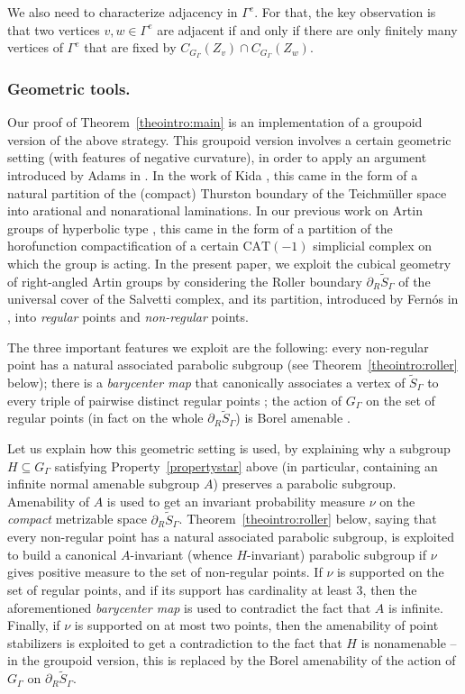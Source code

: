 \documentclass[JEP,XML,SOM,Unicode,NoFloatCountersInSection,published]{cedram}
\theoremstyle{plain}
\theoremstyle{definition}
\begin{document}
We also need to characterize adjacency in $\Gamma^e$. For that, the key observation is that two vertices $v,w\in \Gamma^e$ are adjacent if and only if there are only finitely many vertices of $\Gamma^e$ that are fixed by $C_{G_\Gamma}(Z_v)\cap C_{G_\Gamma}(Z_w)$.

\subsubsection*{Geometric tools.} Our proof of Theorem~\ref{theointro:main} is an implementation of a groupoid version of the above strategy. This groupoid version involves a certain geometric setting (with features of negative curvature), in order to apply an argument introduced by Adams in \cite{Ada}. In the work of Kida \cite{Kid}, this came in the form of a natural partition of the (compact) Thurston boundary of the Teichmüller space into arational and nonarational laminations. In our previous work on Artin groups of hyperbolic type \cite{HH}, this came in the form of a partition of the horofunction compactification of a certain $\mathrm{CAT}(-1)$ simplicial complex on which the group is acting. In the present paper, we exploit the cubical geometry of right-angled Artin groups by considering the Roller boundary $\partial_R\widetilde{S}_\Gamma$ of the universal cover of the Salvetti complex, and its partition, introduced by Fernós in \cite{Fer}, into \emph{regular} points and \emph{non-regular} points.

The three important features we exploit are the following: every non-regular point has a natural associated parabolic subgroup (see Theorem~\ref{theointro:roller} below); there is a \emph{barycenter map} that canonically associates a vertex of $\widetilde{S}_\Gamma$ to every triple of pairwise distinct regular points \cite{FLM}; the action of $G_\Gamma$ on the set of regular points (in fact on the whole $\partial_R\widetilde{S}_\Gamma$) is Borel amenable \cite{NS,Duc}.

Let us explain how this geometric setting is used, by explaining why a subgroup $H\subseteq G_\Gamma$ satisfying Property~\eqref{propertystar} above (in particular, containing an infinite normal amenable subgroup $A$) preserves a parabolic subgroup. Amenability of $A$ is used to get an invariant probability measure $\nu$ on the \emph{compact} metrizable space $\partial_R\widetilde{S}_\Gamma$. Theorem~\ref{theointro:roller} below, saying that every non-regular point has a natural associated parabolic subgroup, is exploited to build a canonical $A$-invariant (whence $H$-invariant) parabolic subgroup if $\nu$ gives positive measure to the set of non-regular points. If $\nu$ is supported on the set of regular points, and if its support has cardinality at least $3$, then the aforementioned \emph{barycenter map} is used to contradict the fact that $A$ is infinite. Finally, if $\nu$ is supported on at most two points, then the amenability of point stabilizers is exploited to get a contradiction to the fact that $H$ is nonamenable -- in the groupoid version, this is replaced by the Borel amenability of the action of $G_\Gamma$ on $\partial_R\widetilde{S}_\Gamma$.
\end{document}
